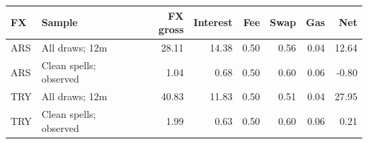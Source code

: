 \begin{tabular}{llrrrrrr}
\toprule
FX & Sample & FX gross & Interest & Fee & Swap & Gas & Net \\
\midrule
ARS & All draws; 12m & 28.11 & 14.38 & 0.50 & 0.56 & 0.04 & 12.64 \\
ARS & Clean spells; observed & 1.04 & 0.68 & 0.50 & 0.60 & 0.06 & -0.80 \\
TRY & All draws; 12m & 40.83 & 11.83 & 0.50 & 0.51 & 0.04 & 27.95 \\
TRY & Clean spells; observed & 1.99 & 0.63 & 0.50 & 0.60 & 0.06 & 0.21 \\
\bottomrule
\end{tabular}
